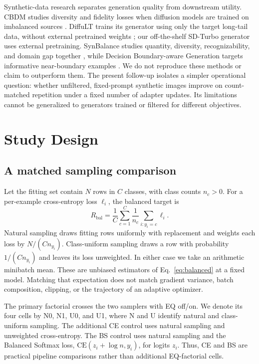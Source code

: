 \documentclass[conference]{IEEEtran}
\begin{document}
Synthetic-data research separates generation quality from downstream utility. CBDM studies diversity and fidelity losses when diffusion models are trained on imbalanced sources \cite{qin2023}. DiffuLT trains its generator using only the target long-tail data, without external pretrained weights \cite{shao2024}; our off-the-shelf SD-Turbo generator uses external pretraining. SynBalance studies quantity, diversity, recognizability, and domain gap together \cite{jiang2025}, while Decision Boundary-aware Generation targets informative near-boundary examples \cite{yang2026}. We do not reproduce these methods or claim to outperform them. The present follow-up isolates a simpler operational question: whether unfiltered, fixed-prompt synthetic images improve on count-matched repetition under a fixed number of adapter updates. Its limitations cannot be generalized to generators trained or filtered for different objectives.

\section{Study Design}
\subsection{A matched sampling comparison}
Let the fitting set contain $N$ rows in $C$ classes, with class counts $n_c>0$. For a per-example cross-entropy loss $\ell_i$, the balanced target is
\begin{equation}
R_{\mathrm{bal}}=\frac{1}{C}\sum_{c=1}^{C}\frac{1}{n_c}\sum_{i:y_i=c}\ell_i.
\label{eq:balanced}
\end{equation}
Natural sampling draws fitting rows uniformly with replacement and weights each loss by $N/(Cn_{y_i})$. Class-uniform sampling draws a row with probability $1/(Cn_{y_i})$ and leaves its loss unweighted. In either case we take an arithmetic minibatch mean. These are unbiased estimators of Eq.~\eqref{eq:balanced} at a fixed model. Matching that expectation does not match gradient variance, batch composition, clipping, or the trajectory of an adaptive optimizer.

The primary factorial crosses the two samplers with EQ off/on. We denote its four cells by N0, N1, U0, and U1, where N and U identify natural and class-uniform sampling. The additional CE control uses natural sampling and unweighted cross-entropy. The BS control uses natural sampling and the Balanced Softmax loss, $\mathrm{CE}(z_i+\log n,y_i)$, for logits $z_i$. Thus, CE and BS are practical pipeline comparisons rather than additional EQ-factorial cells.
\end{document}
